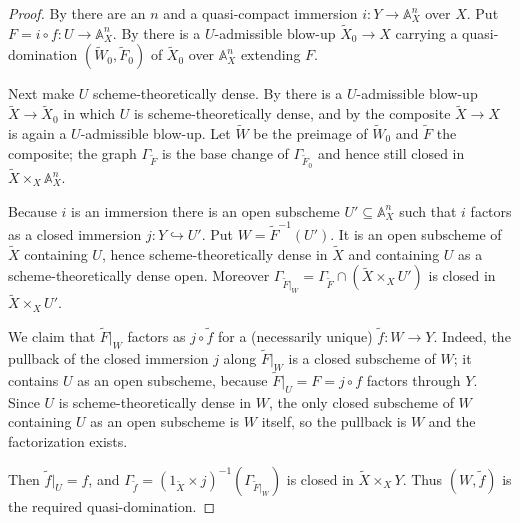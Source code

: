 \begin{proof}
  \leanok
  By  there are
  an $n$ and a quasi-compact immersion $i\colon Y\to\mathbb A^n_X$ over $X$.
  Put $F=i\circ f\colon U\to\mathbb A^n_X$.  By
   there is a $U$-admissible
  blow-up $\widetilde X_0\to X$ carrying a quasi-domination
  $(\widetilde W_0,\widetilde F_0)$ of $\widetilde X_0$ over $\mathbb A^n_X$
  extending $F$.

  Next make $U$ scheme-theoretically dense.  By
   there is a
  $U$-admissible blow-up $\widetilde X\to\widetilde X_0$ in which $U$ is
  scheme-theoretically dense, and by
   the composite
  $\widetilde X\to X$ is again a $U$-admissible blow-up.  Let $\widetilde W$ be
  the preimage of $\widetilde W_0$ and $\widetilde F$ the composite; the graph
  $\Gamma_{\widetilde F}$ is the base change of $\Gamma_{\widetilde F_0}$ and
  hence still closed in $\widetilde X\times_X\mathbb A^n_X$.

  Because $i$ is an immersion there is an open subscheme
  $U'\subseteq\mathbb A^n_X$ such that $i$ factors as a closed immersion
  $j\colon Y\hookrightarrow U'$.  Put $W=\widetilde F^{-1}(U')$.  It is an open
  subscheme of $\widetilde X$ containing $U$, hence scheme-theoretically dense
  in $\widetilde X$ and containing $U$ as a scheme-theoretically dense open.
  Moreover $\Gamma_{\widetilde F|_W}
  =\Gamma_{\widetilde F}\cap(\widetilde X\times_XU')$ is closed in
  $\widetilde X\times_XU'$.

  We claim that $\widetilde F|_W$ factors as $j\circ\widetilde f$ for a
  (necessarily unique) $\widetilde f\colon W\to Y$.  Indeed, the pullback of
  the closed immersion $j$ along $\widetilde F|_W$ is a closed subscheme of
  $W$; it contains $U$ as an open subscheme, because
  $\widetilde F|_U=F=j\circ f$ factors through $Y$.  Since $U$ is
  scheme-theoretically dense in $W$, the only closed subscheme of $W$
  containing $U$ as an open subscheme is $W$ itself, so the pullback is $W$
  and the factorization exists.

  Then $\widetilde f|_U=f$, and $\Gamma_{\widetilde f}
  =(1_{\widetilde X}\times j)^{-1}(\Gamma_{\widetilde F|_W})$ is closed in
  $\widetilde X\times_XY$.  Thus $(W,\widetilde f)$ is the required
  quasi-domination.
\end{proof}

